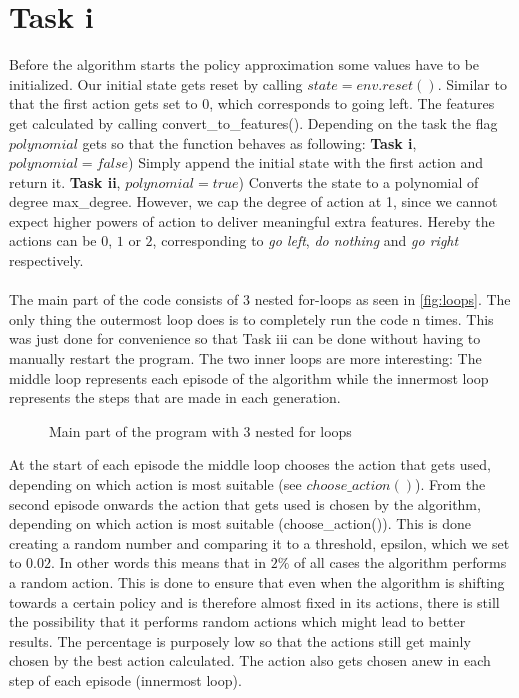 \documentclass{article}
\begin{document}
	\section{Task i}
	\label{sec:Taski}
	Before the algorithm starts the policy approximation some values have to be initialized. Our initial state gets reset by calling $state = env.reset()$. Similar to that the first action gets set to $0$, which corresponds to going left. The features get calculated by calling convert\_to\_features(). Depending on the task the flag $polynomial$ gets so that the function behaves as following: \textbf{Task i}, $polynomial = false$) Simply append the initial state with the first action and return it. \textbf{Task ii}, $polynomial = true$) Converts the state to a polynomial of degree max\_degree. However, we cap the degree of action at 1, since we cannot expect higher powers of action to deliver meaningful extra features. Hereby the actions can be $0$, $1$ or $2$, corresponding to \textit{go left}, \textit{do nothing} and \textit{go right} respectively.\\
	\\
	The main part of the code consists of 3 nested for-loops as seen in \autoref{fig:loops}. The only thing the outermost loop does is to completely run the code n times. This was just done for convenience so that Task iii can be done without having to manually restart the program. The two inner loops are more interesting: The middle loop represents each episode of the algorithm while the innermost loop represents the steps that are made in each generation. 
	
	\begin{figure}
		\caption{Main part of the program with 3 nested for loops}
		\label{fig:loops}
		
	\end{figure}
	
	\FloatBarrier
	
	\noindent At the start of each episode the middle loop chooses the action that gets used, depending on which action is most suitable (see $choose\_action()$). From the second episode onwards the action that gets used is chosen by the algorithm, depending on which action is most suitable (choose\_action()). This is done creating a random number and comparing it to a threshold, epsilon, which we set to $0.02$. In other words this means that in $2\%$ of all cases the algorithm performs a random action. This is done to ensure that even when the algorithm is shifting towards a certain policy and is therefore almost fixed in its actions, there is still the possibility that it performs random actions which might lead to better results. The percentage is purposely low so that the actions still get mainly chosen by the best action calculated. The action also gets chosen anew in each step of each episode (innermost loop). 
	
\end{document}
